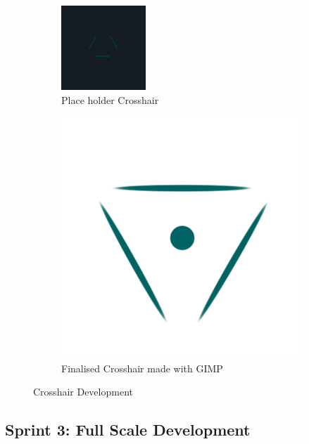 \begin{figure}[H]
\centering
\begin{subfigure}{0.5\textwidth}
  \centering
  \includegraphics[scale=1.4]{Figures/crossold.png}
  \caption{Place holder Crosshair}
\end{subfigure}%
\begin{subfigure}{0.5\textwidth}
  \centering
  \includegraphics[scale=1]{Figures/crosshair.png}
  \caption{Finalised Crosshair made with GIMP}
\end{subfigure}
\caption{Crosshair Development}
\end{figure}



\subsection{Sprint 3: Full Scale Development}


